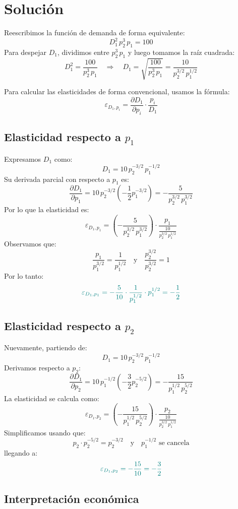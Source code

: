 \documentclass{article}
\begin{document}
\newpage
\section*{Solución}

Reescribimos la función de demanda de forma equivalente:
\[
D_1^2\, p_2^3\, p_1 = 100
\]
Para despejar \(D_1\), dividimos entre \(p_2^3\, p_1\) y luego tomamos la raíz cuadrada:
\[
D_1^2 = \frac{100}{p_2^3\, p_1} \quad \Longrightarrow \quad D_1 = \sqrt{\frac{100}{p_2^3\, p_1}} = \frac{10}{p_2^{3/2}\, p_1^{1/2}}
\]

Para calcular las elasticidades de forma convencional, usamos la fórmula:
\[
\varepsilon_{D_1,p_i} = \frac{\partial D_1}{\partial p_i}\cdot\frac{p_i}{D_1}
\]

\subsection*{Elasticidad respecto a \(p_1\)}

Expresamos \(D_1\) como:
\[
D_1 = 10\, p_2^{-3/2}\, p_1^{-1/2}
\]
Su derivada parcial con respecto a \(p_1\) es:
\[
\frac{\partial D_1}{\partial p_1} = 10\, p_2^{-3/2}\left(-\frac{1}{2}p_1^{-3/2}\right) = -\frac{5}{p_2^{3/2}\, p_1^{3/2}}
\]
Por lo que la elasticidad es:
\[
\varepsilon_{D_1,p_1} = \left(-\frac{5}{p_2^{3/2}\, p_1^{3/2}}\right) \cdot \frac{p_1}{\frac{10}{p_2^{3/2}\, p_1^{1/2}}}
\]
Observamos que:
\[
\frac{p_1}{p_1^{3/2}} = \frac{1}{p_1^{1/2}} \quad \text{y} \quad \frac{p_2^{3/2}}{p_2^{3/2}} = 1
\]
Por lo tanto:
\[
\color{teal}
\varepsilon_{D_1,p_1} = -\frac{5}{10} \cdot \frac{1}{p_1^{1/2}} \cdot p_1^{1/2} = -\frac{1}{2}
\]

\subsection*{Elasticidad respecto a \(p_2\)}

Nuevamente, partiendo de:
\[
D_1 = 10\, p_2^{-3/2}\, p_1^{-1/2}
\]
Derivamos respecto a \(p_2\):
\[
\frac{\partial D_1}{\partial p_2} = 10\, p_1^{-1/2}\left(-\frac{3}{2}p_2^{-5/2}\right) = -\frac{15}{p_1^{1/2}\, p_2^{5/2}}
\]
La elasticidad se calcula como:
\[
\varepsilon_{D_1,p_2} = \left(-\frac{15}{p_1^{1/2}\, p_2^{5/2}}\right) \cdot \frac{p_2}{\frac{10}{p_2^{3/2}\, p_1^{1/2}}}
\]
Simplificamos usando que:
\[
p_2\cdot p_2^{-5/2} = p_2^{-3/2} \quad \text{y} \quad p_1^{-1/2} \text{ se cancela}
\]
llegando a:
\[
\color{teal}
\varepsilon_{D_1,p_2} = -\frac{15}{10} = -\frac{3}{2}
\]

\subsection*{Interpretación económica}
\end{document}
